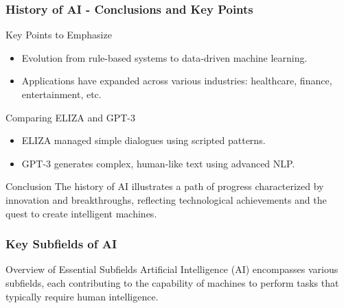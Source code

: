 \documentclass[aspectratio=169]{beamer}
\begin{document}
\begin{frame}[fragile]
    \frametitle{History of AI - Conclusions and Key Points}
    \begin{block}{Key Points to Emphasize}
        \begin{itemize}
            \item Evolution from rule-based systems to data-driven machine learning.
            \item Applications have expanded across various industries: healthcare, finance, entertainment, etc.
        \end{itemize}
    \end{block}
    
    \begin{block}{Comparing ELIZA and GPT-3}
        \begin{itemize}
            \item ELIZA managed simple dialogues using scripted patterns.
            \item GPT-3 generates complex, human-like text using advanced NLP.
        \end{itemize}
    \end{block}

    \begin{block}{Conclusion}
        The history of AI illustrates a path of progress characterized by innovation and breakthroughs, reflecting technological achievements and the quest to create intelligent machines.
    \end{block}
\end{frame}

\begin{frame}[fragile]
    \frametitle{Key Subfields of AI}
    \begin{block}{Overview of Essential Subfields}
        Artificial Intelligence (AI) encompasses various subfields, each contributing to the capability of machines to perform tasks that typically require human intelligence. 
    \end{block}
\end{frame}
\end{document}
